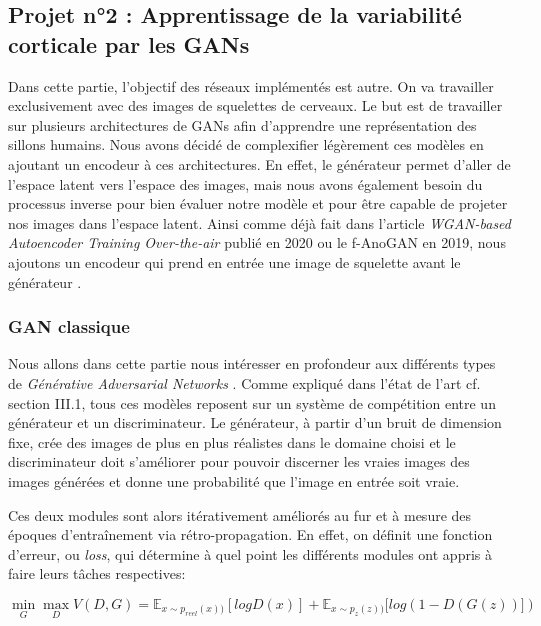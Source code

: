 \documentclass[12pt, oneside, a4paper, titlepage]{article}
\begin{document}
\newpage

\subsection{Projet n°2 : Apprentissage de la variabilité corticale par les GANs}

Dans cette partie, l'objectif des réseaux implémentés est autre. On va travailler exclusivement avec des images de squelettes de cerveaux. Le but est de travailler sur plusieurs architectures de GANs afin d'apprendre une représentation des sillons humains. 
Nous avons décidé de complexifier légèrement ces modèles en ajoutant un encodeur à ces architectures. En effet, le générateur permet d'aller de l'espace latent vers l'espace des images, mais nous avons également besoin du processus inverse pour bien évaluer notre modèle et pour être capable de projeter nos images dans l'espace latent. Ainsi comme déjà fait dans l'article \textit{WGAN-based Autoencoder Training Over-the-air} publié en 2020 ou le f-AnoGAN en 2019, nous ajoutons un encodeur qui prend en entrée une image de squelette avant le générateur \cite{dorner_wgan-based_2020} \cite{schlegl_f-anogan_2019}. 


\subsubsection{GAN classique}
\vspace{5mm} 

Nous allons dans cette partie nous intéresser en profondeur aux différents types de \textit{Générative Adversarial Networks} \cite{goodfellow_generative_2014}. Comme expliqué dans l'état de l'art cf. section III.1, tous ces modèles reposent sur un système de compétition entre un générateur et un discriminateur. Le générateur, à partir d'un bruit de dimension fixe, crée des images de plus en plus réalistes dans le domaine choisi et le discriminateur doit s'améliorer pour pouvoir discerner les vraies images des images générées et donne une probabilité que l'image en entrée soit vraie.

Ces deux modules sont alors itérativement améliorés au fur et à mesure des époques d’entraînement via rétro-propagation. En effet, on définit une fonction d’erreur, ou \textit{loss}, qui détermine à quel point les différents modules ont appris à faire leurs tâches respectives:
 

\begin{equation}
    \min_{G} \max_{D}V(D,G)= \mathbb{E}_{x\sim p_{reel}(x)) }[logD(x)] + \mathbb{E}_{x\sim p_{z}(z)) }[log(1 - D(G(z))])
\end{equation}
\end{document}
